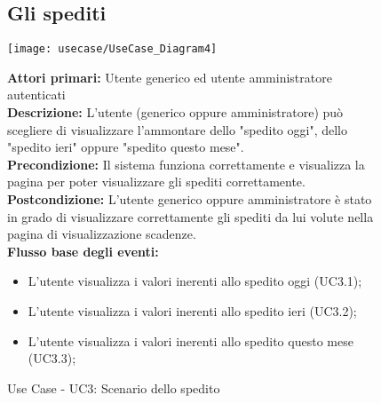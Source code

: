 \begin{figure}[h!]
\subsection{Gli spediti}
   \begin{center}
    \texttt{[image: usecase/UseCase\_Diagram4]} 
    \caption{Use Case - UC3: Scenario dello spedito}
    \end{center}


\textbf{Attori primari:} Utente generico ed utente amministratore autenticati
\\
\textbf{Descrizione:}  L'utente (generico oppure amministratore) può scegliere di visualizzare l'ammontare dello "spedito oggi", dello "spedito ieri" oppure "spedito questo mese".  \\

\textbf{Precondizione:} Il sistema funziona correttamente e visualizza la pagina per poter visualizzare gli spediti correttamente. \\

\textbf{Postcondizione:} L'utente generico oppure amministratore è stato in grado di visualizzare correttamente gli spediti da lui volute nella pagina di visualizzazione scadenze.  \\


\textbf{Flusso base degli eventi:} 

\begin{itemize}

\item L'utente visualizza i valori inerenti allo spedito oggi (UC3.1);
\item L'utente visualizza i valori inerenti allo spedito ieri (UC3.2);
\item L'utente visualizza i valori inerenti allo spedito questo mese (UC3.3);

\end{itemize}
\end{figure}



